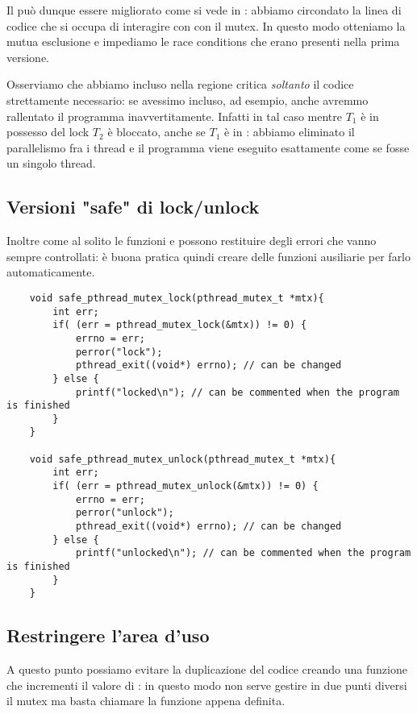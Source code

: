 Il  può dunque essere migliorato come si vede in : abbiamo circondato la linea di codice che si occupa di interagire con  con il mutex. In questo modo otteniamo la mutua esclusione e impediamo le race conditions che erano presenti nella prima versione.

Osserviamo che abbiamo incluso nella regione critica \emph{soltanto} il codice strettamente necessario: se avessimo incluso, ad esempio, anche  avremmo rallentato il programma inavvertitamente. Infatti in tal caso mentre $T_1$ è in possesso del lock $T_2$ è bloccato, anche se $T_1$ è in : abbiamo eliminato il parallelismo fra i thread e il programma viene eseguito esattamente come se fosse un singolo thread.

\subsection{Versioni "safe" di lock/unlock}

Inoltre come al solito le funzioni  e  possono restituire degli errori che vanno sempre controllati: è buona pratica quindi creare delle funzioni ausiliarie per farlo automaticamente.

\begin{verbatim}
    void safe_pthread_mutex_lock(pthread_mutex_t *mtx){
        int err;
        if( (err = pthread_mutex_lock(&mtx)) != 0) {
            errno = err;
            perror("lock");
            pthread_exit((void*) errno); // can be changed
        } else {
            printf("locked\n"); // can be commented when the program is finished
        }
    }

    void safe_pthread_mutex_unlock(pthread_mutex_t *mtx){
        int err;
        if( (err = pthread_mutex_unlock(&mtx)) != 0) {
            errno = err;
            perror("unlock");
            pthread_exit((void*) errno); // can be changed
        } else {
            printf("unlocked\n"); // can be commented when the program is finished
        }
    }
\end{verbatim}

\subsection{Restringere l'area d'uso}

A questo punto possiamo evitare la duplicazione del codice creando una funzione che incrementi il valore di : in questo modo non serve gestire in due punti diversi il mutex ma basta chiamare la funzione appena definita.

